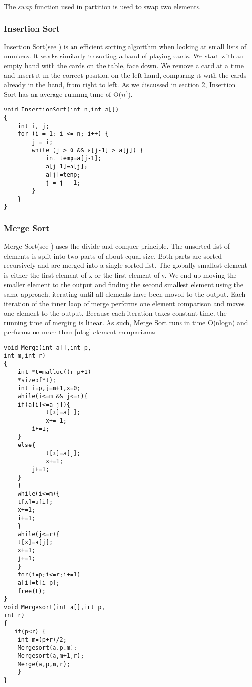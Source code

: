 \documentclass{article}
\numberwithin{figure}{section}
\begin{document}
The \textit{swap} function used in partition is used to swap two elements.

\subsubsection{Insertion Sort}

Insertion Sort(see \cite{Thomas}) is an efficient sorting algorithm when looking at small lists of numbers. It works similarly to sorting a hand of playing cards. We start with an empty hand with the cards on the table, face down. We remove a card at a time and insert it in the correct position on the left hand, comparing it with the cards already in the hand, from right to left. As we discussed in section 2, Insertion Sort has an average running time of O(\(n^2\)).

\begin{lstlisting}[frame=none]
void InsertionSort(int n,int a[])
{
    int i, j;
    for (i = 1; i <= n; i++) {
        j = i;
        while (j > 0 && a[j-1] > a[j]) {
            int temp=a[j-1];
            a[j-1]=a[j];
            a[j]=temp;
            j = j - 1;
        }
    }
}
\end{lstlisting}

\subsubsection{Merge Sort}

Merge Sort(see \cite{Kurt}) uses the divide-and-conquer principle. The unsorted list of elements is split into two parts of about equal size. Both parts are sorted recursively and are merged into a single sorted list. The globally smallest element is either the first element of x or the first element of y. We end up moving the smaller element to the output and finding the second smallest element using the same approach, iterating until all elements have been moved to the output. Each iteration of the inner loop of merge performs one element comparison and moves one element to the output. Because each iteration takes constant time, the running time of merging is linear. As such, Merge Sort runs in time O(nlogn) and performs no more than [nlog] element comparisons.


\begin{multicols}{2}
\begin{lstlisting}[frame=none]
void Merge(int a[],int p,
int m,int r)
{
    int *t=malloc((r-p+1)
    *sizeof*t);
    int i=p,j=m+1,x=0;
    while(i<=m && j<=r){
	if(a[i]<=a[j]){
            t[x]=a[i];
            x+= 1;
	    i+=1;
	}
	else{
            t[x]=a[j];
            x+=1; 
	    j+=1;
	}
    }
    while(i<=m){
	t[x]=a[i];
	x+=1;
	i+=1;
    }
    while(j<=r){
	t[x]=a[j];
	x+=1; 
	j+=1;
    }
    for(i=p;i<=r;i+=1)
	a[i]=t[i-p];
    free(t);
}
void Mergesort(int a[],int p,
int r)
{
   if(p<r) {
	int m=(p+r)/2;
	Mergesort(a,p,m);
	Mergesort(a,m+1,r);
	Merge(a,p,m,r);
    }
}
\end{lstlisting}
\end{multicols}
\end{document}
